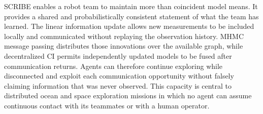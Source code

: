 \documentclass[letterpaper,10pt,conference]{ieeeconf}
\begin{document}
SCRIBE enables a robot team to maintain more than coincident model means. It
provides a shared and probabilistically consistent statement of what the team
has learned. The linear information update allows new measurements to be
included locally and communicated without replaying the observation history.
MHMC message passing distributes those innovations over the available graph,
while decentralized CI permits independently updated models to be fused after
communication returns. Agents can therefore continue exploring while
disconnected and exploit each communication opportunity without falsely
claiming information that was never observed. This capacity is central to
distributed ocean and space exploration missions in which no agent can assume
continuous contact with its teammates or with a human operator.

\balance


\end{document}
